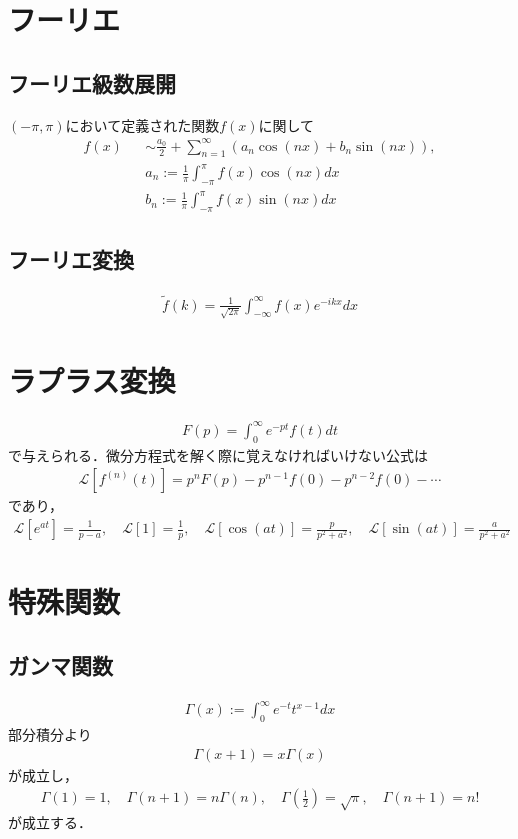 \documentclass[12pt,dvipdfmx]{jsarticle}
\begin{document}
\section*{\Large{フーリエ}}
\subsection*{フーリエ級数展開}
$(-\pi,\pi)$において定義された関数$f(x)$に関して
\begin{eqnarray}
  f(x) &&\sim \frac{a_0}{2} + \sum_{n=1}^{\infty}\left( a_n \cos(nx) + b_n\sin(nx) \right),\\
  && a_n := \frac{1}{\pi}\int_{-\pi}^{\pi} f(x)\cos(nx) dx\\
  && b_n := \frac{1}{\pi}\int_{-\pi}^{\pi} f(x)\sin(nx)dx
\end{eqnarray}
\subsection*{フーリエ変換}
\begin{eqnarray}
  \tilde{f}(k)= \frac{1}{\sqrt{2\pi}} \int_{-\infty}^{\infty}f(x)e^{-ikx}dx
\end{eqnarray}

\section*{\Large{ラプラス変換}}
\begin{eqnarray}
  F(p) = \int_0^\infty e^{-pt}f(t)dt
\end{eqnarray}
で与えられる．微分方程式を解く際に覚えなければいけない公式は
\begin{eqnarray}
  \mathcal{L}[f^{(n)}(t)] = p^nF(p) -p^{n-1}f(0) - p^{n-2} f(0) -\cdots
\end{eqnarray}
であり，
\begin{eqnarray}
  \mathcal{L}[e^{at}] = \frac{1}{p-a}, \quad \mathcal{L}[1]= \frac{1}{p},\quad \mathcal{L}[\cos(at)] = \frac{p}{p^2+a^2}, \quad \mathcal{L}[\sin(at)] = \frac{a}{p^2+a^2}
\end{eqnarray}
\section*{\Large{特殊関数}}
\subsection*{\large{ガンマ関数}}
\begin{eqnarray}
  \Gamma(x) := \int_0^\infty e^{-t}t^{x-1}dx
\end{eqnarray}
部分積分より
\begin{eqnarray}
  \Gamma(x+1) = x \Gamma(x)
\end{eqnarray}
が成立し，
\begin{eqnarray}
  \Gamma(1)=1,\quad \Gamma(n+1) = n\Gamma(n),\quad \Gamma\left(\frac{1}{2}\right)= \sqrt{\pi},\quad \Gamma(n+1) = n!
\end{eqnarray}
が成立する．
\end{document}
